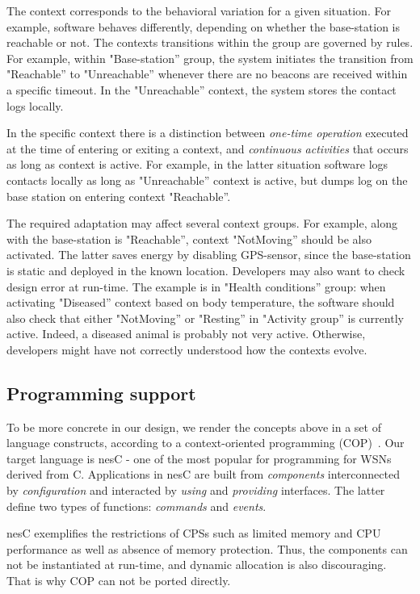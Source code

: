 The context corresponds to the behavioral variation for a given situation. For
example, software behaves differently, depending on whether the base-station is
reachable or not. The contexts transitions within the group are governed by
rules. For example, within "Base-station'' group, the system initiates the
transition from "Reachable'' to "Unreachable'' whenever there are no beacons are
received within a specific timeout. In the "Unreachable'' context, the system
stores the contact logs locally.

In the specific context there is a distinction between \emph{one-time operation}
executed at the time of entering or exiting a context, and \emph{continuous
activities} that occurs as long as context is active. For example, in the latter
situation software logs contacts locally as long as "Unreachable'' context is
active, but dumps log on the base station on entering context "Reachable''.

The required adaptation may affect several context groups. For example, along
with the base-station is "Reachable'', context "NotMoving'' should be also
activated. The latter saves energy by disabling GPS-sensor, since the
base-station is static and deployed in the known location. Developers may also
want to check design error at run-time. The example is in "Health conditions''
group: when activating "Diseased'' context based on body temperature, the
software should also check that either "NotMoving'' or "Resting'' in "Activity
group'' is currently active. Indeed, a diseased animal is probably not very
active. Otherwise, developers might have not correctly understood how the
contexts evolve.

\subsection{Programming support}

To be more concrete in our design, we render the concepts above in a set of
language constructs, according to a context-oriented programming
(COP)~\cite{Hirschfeld08}. Our target language is nesC - one of the most popular
for programming for WSNs derived from C. Applications in nesC are built from
\emph{components} interconnected by \emph{configuration} and interacted by
\emph{using} and \emph{providing} interfaces. The latter define two types of
functions: \emph{commands} and \emph{events}.

nesC exemplifies the restrictions of CPSs such as limited memory and CPU
performance as well as absence of memory protection. Thus, the components can
not be instantiated at run-time, and dynamic allocation is also discouraging.
That is why COP can not be ported directly.

